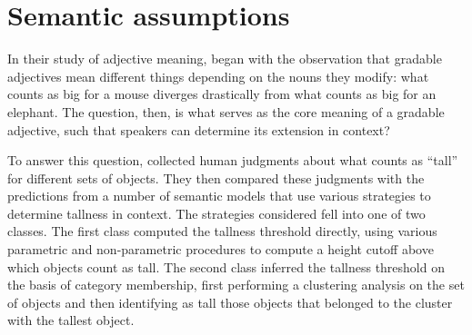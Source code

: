 \documentclass[10pt,a4paper]{article}
\begin{document}
\section{Semantic assumptions}


In their study of adjective meaning,  began with the observation that gradable adjectives mean different things depending on the nouns they modify: what counts as big for a mouse diverges drastically from what counts as big for an elephant. The question, then, is what serves as the core meaning of a gradable adjective, such that speakers can determine its extension in context? 
 
To answer this question, \citeauthor{schmidtetal2009} collected human judgments about what counts as ``tall'' for different sets of objects. They then compared these judgments with the predictions from a number of semantic models that use various strategies to determine tallness in context. The strategies considered fell into one of two classes. The first class computed the tallness threshold directly, using various parametric and non-parametric procedures to compute a height cutoff above which objects count as tall. The second class inferred the tallness threshold on the basis of category membership, first performing a clustering analysis on the set of objects and then identifying as tall those objects that belonged to the cluster with the tallest object.
\end{document}
